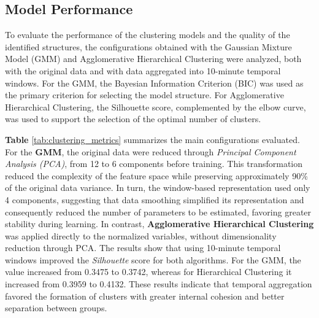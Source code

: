 \documentclass[a4paper,fleqn]{cas-sc}
\begin{document}
\subsection{Model Performance}

To evaluate the performance of the clustering models and the quality of the identified structures, the configurations obtained with the Gaussian Mixture Model (GMM) and Agglomerative Hierarchical Clustering were analyzed, both with the original data and with data aggregated into 10-minute temporal windows. For the GMM, the Bayesian Information Criterion (BIC) was used as the primary criterion for selecting the model structure. For Agglomerative Hierarchical Clustering, the Silhouette score, complemented by the elbow curve, was used to support the selection of the optimal number of clusters.

\begin{center}
\label{tab:clustering_metrics}
\end{center}

\textbf{Table} \ref{tab:clustering_metrics} summarizes the main configurations evaluated. For the \textbf{GMM}, the original data were reduced through \textit{Principal Component Analysis (PCA)}, from 12 to 6 components before training. This transformation reduced the complexity of the feature space while preserving approximately 90\% of the original data variance. In turn, the window-based representation used only 4 components, suggesting that data smoothing simplified its representation and consequently reduced the number of parameters to be estimated, favoring greater stability during learning. In contrast, \textbf{Agglomerative Hierarchical Clustering} was applied directly to the normalized variables, without dimensionality reduction through PCA. The results show that using 10-minute temporal windows improved the \textit{Silhouette} score for both algorithms. For the GMM, the value increased from 0.3475 to 0.3742, whereas for Hierarchical Clustering it increased from 0.3959 to 0.4132. These results indicate that temporal aggregation favored the formation of clusters with greater internal cohesion and better separation between groups.
\end{document}
